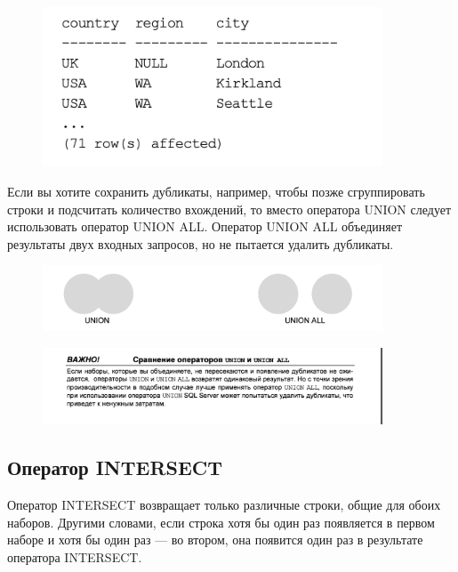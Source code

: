 \begin{figure}[h!]
	\begin{center}
		\includegraphics[width=0.9\textwidth]{img/examp1.png}
	\end{center}
	\captionsetup{justification=centering}
\end{figure}

Если вы хотите сохранить дубликаты, например, чтобы позже сгруппировать строки и подсчитать количество вхождений, то вместо оператора UNION следует использовать оператор UNION ALL. Оператор UNION ALL объединяет результаты двух входных запросов, но не пытается удалить дубликаты.

\begin{figure}[h!]
	\begin{center}
		\includegraphics[width=0.9\textwidth]{img/unionall.png}
	\end{center}
	\captionsetup{justification=centering}
\end{figure}


\begin{figure}[h!]
	\begin{center}
		\includegraphics[width=0.9\textwidth]{img/warn.png}
	\end{center}
	\captionsetup{justification=centering}
\end{figure}


\subsection{Оператор INTERSECT}
Оператор INTERSECT возвращает только различные строки, общие для обоих наборов. Другими словами, если строка хотя бы один раз появляется в первом наборе и
хотя бы один раз — во втором, она появится один раз в результате оператора
INTERSECT.

